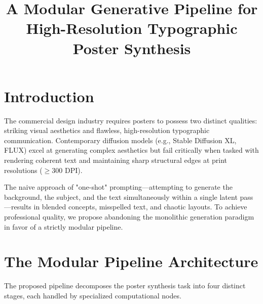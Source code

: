 \documentclass[10pt,journal,compsoc]{IEEEtran}
\begin{document}
\title{A Modular Generative Pipeline for High-Resolution Typographic Poster Synthesis}


\maketitle
\IEEEdisplaynontitleabstractindextext
\IEEEpeerreviewmaketitle


\newtheorem{theorem}{Theorem}
\newtheorem{lemma}{Lemma}
\newtheorem{definition}{Definition}

\section{Introduction}
The commercial design industry requires posters to possess two distinct qualities: striking visual aesthetics and flawless, high-resolution typographic communication. Contemporary diffusion models (e.g., Stable Diffusion XL, FLUX) excel at generating complex aesthetics but fail critically when tasked with rendering coherent text and maintaining sharp structural edges at print resolutions ($\ge 300$ DPI).

The naive approach of "one-shot" prompting—attempting to generate the background, the subject, and the text simultaneously within a single latent pass—results in blended concepts, misspelled text, and chaotic layouts. To achieve professional quality, we propose abandoning the monolithic generation paradigm in favor of a strictly modular pipeline.

\section{The Modular Pipeline Architecture}
The proposed pipeline decomposes the poster synthesis task into four distinct stages, each handled by specialized computational nodes.
\end{document}
